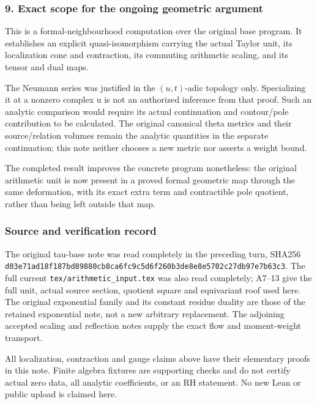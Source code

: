 \documentclass{article}
\begin{document}
\subsubsection{9. Exact scope for the ongoing geometric argument}\label{endpoint-f1_unit_gauge--exact-scope-for-the-ongoing-geometric-argument}

This is a formal-neighbourhood computation over the original base program. It establishes an explicit quasi-isomorphism carrying the actual Taylor unit, its localization cone and contraction, its commuting arithmetic scaling, and its tensor and dual maps.

The Neumann series was justified in the \((u,t)\)-adic topology only. Specializing it at a nonzero complex u is not an authorized inference from that proof. Such an analytic comparison would require its actual continuation and contour/pole contribution to be calculated. The original canonical theta metrics and their source/relation volumes remain the analytic quantities in the separate continuation; this note neither chooses a new metric nor asserts a weight bound.

The completed result improves the concrete program nonetheless: the original arithmetic unit is now present in a proved formal geometric map through the same deformation, with its exact extra term and contractible pole quotient, rather than being left outside that map.

\subsubsection{Source and verification record}\label{endpoint-f1_unit_gauge--source-and-verification-record}

The original tau-base note was read completely in the preceding turn, SHA256 \nolinkurl{d03e71ad18f187bd89880cb8ca6fc9c5d6f260b3de8e8e5702c27db97e7b63c3}. The full current \nolinkurl{tex/arithmetic_input.tex} was also read completely; A7--13 give the full unit, actual source section, quotient square and equivariant roof used here. The original exponential family and its constant residue duality are those of the retained exponential note, not a new arbitrary replacement. The adjoining accepted scaling and reflection notes supply the exact flow and moment-weight transport.

All localization, contraction and gauge claims above have their elementary proofs in this note. Finite algebra fixtures are supporting checks and do not certify actual zero data, all analytic coefficients, or an RH statement. No new Lean or public upload is claimed here.

\endgroup
\end{document}
